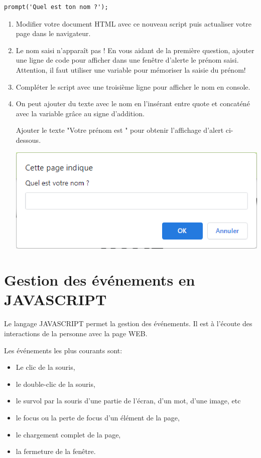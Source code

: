 \documentclass[12pt,a4paper]{article}
\begin{document}
\begin{enumerate}
\begin{lstlisting}
prompt('Quel est ton nom ?');
\end{lstlisting}

\begin{enumerate}
\item Modifier votre document HTML avec ce nouveau script puis actualiser votre page dans le navigateur.

\item Le nom saisi n'apparaît pas ! En vous aidant de la première question, ajouter une ligne de code pour afficher dans une fenêtre d'alerte le prénom saisi. Attention, il faut utiliser une variable pour mémoriser la saisie du prénom!

\item Compléter le script avec une troisième ligne pour afficher le nom en console.

\item On peut ajouter du texte avec le nom en l'insérant entre quote et concaténé avec la variable grâce au signe d'addition.

Ajouter le texte \textsf{"Votre prénom est "} pour obtenir l'affichage d'alert ci-dessous.

\begin{center}
\includegraphics[scale=0.8]{img/alert_nom.eps}
\end{center}
\end{enumerate}

\end{enumerate}

\newpage

\section*{Gestion des événements en JAVASCRIPT}

Le langage JAVASCRIPT permet la gestion des événements. Il est à l'écoute des interactions de la personne avec la page WEB.

Les événements les plus courants sont:
\begin{itemize}
\item Le clic de la souris,
\item le double-clic de la souris,
\item le survol par la souris d'une partie de l'écran, d'un mot, d'une image, etc
\item le focus ou la perte de focus d'un élément de la page,
\item le chargement complet de la page,
\item la fermeture de la fenêtre.
\end{itemize}
\end{document}
